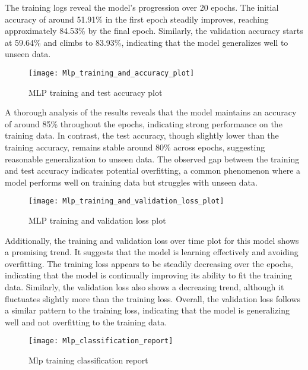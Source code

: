 \documentclass[
	article, %
	11pt, %
]{CSUniSchoolLabReport}
\begin{document}
The training logs reveal the model's progression over 20 epochs. The initial accuracy of around 51.91\% in the first epoch steadily improves, reaching approximately 84.53\% by the final epoch. Similarly, the validation accuracy starts at 59.64\% and climbs to 83.93\%, indicating that the model generalizes well to unseen data. 

\begin{figure}[H] 
	\centering
	\texttt{[image: Mlp\_training\_and\_accuracy\_plot]}
	\caption{MLP training and test accuracy plot}\label{fig:frequency_graph}
\end{figure}

A thorough analysis of the results reveals that the model maintains an accuracy of around 85\% throughout the epochs, indicating strong performance on the training data. In contrast, the test accuracy, though slightly lower than the training accuracy, remains stable around 80\% across epochs, suggesting reasonable generalization to unseen data. The observed gap between the training and test accuracy indicates potential overfitting, a common phenomenon where a model performs well on training data but struggles with unseen data.

\begin{figure}[H] 
	\centering
	\texttt{[image: Mlp\_training\_and\_validation\_loss\_plot]}
	\caption{MLP training and validation loss plot}\label{fig:frequency_graph}
\end{figure}

Additionally, the training and validation loss over time plot for this model shows a promising trend. It suggests that the model is learning effectively and avoiding overfitting. The training loss appears to be steadily decreasing over the epochs, indicating that the model is continually improving its ability to fit the training data. Similarly, the validation loss also shows a decreasing trend, although it fluctuates slightly more than the training loss. Overall, the validation loss follows a similar pattern to the training loss, indicating that the model is generalizing well and not overfitting to the training data.

\begin{figure}[H] 
	\centering
	\texttt{[image: Mlp\_classification\_report]}
	\caption{Mlp training classification report}\label{fig:frequency_graph}
\end{figure}
\end{document}
